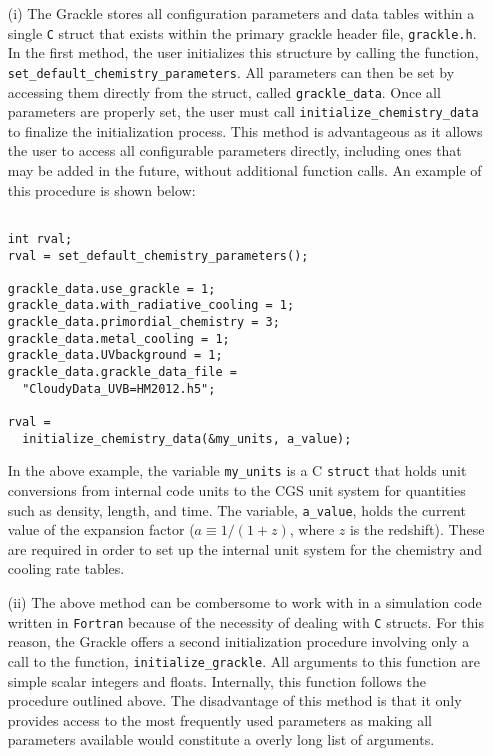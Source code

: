 \begin{enumerate}
\item[(i)] The Grackle stores all configuration parameters and data
  tables within a single \texttt{C} struct that exists within the
  primary grackle header file, \texttt{grackle.h}.  In the first
  method, the user initializes this structure by calling the function,
  \texttt{set\_default\_chemistry\_parameters}.  All parameters can
  then be set by accessing them directly from the struct, called
  \texttt{grackle\_data}.  Once all parameters are properly set, the
  user must call \texttt{initialize\_chemistry\_data} to finalize the
  initialization process.  This method is advantageous as it allows
  the user to access all configurable parameters directly, including
  ones that may be added in the future, without additional function
  calls.  An example of this procedure is shown below:

\vspace{0.5cm}
\begin{minipage}[b]{0.5\linewidth}
\begin{verbatim}

int rval;
rval = set_default_chemistry_parameters();

grackle_data.use_grackle = 1;
grackle_data.with_radiative_cooling = 1;
grackle_data.primordial_chemistry = 3;
grackle_data.metal_cooling = 1;
grackle_data.UVbackground = 1;
grackle_data.grackle_data_file = 
  "CloudyData_UVB=HM2012.h5";

rval = 
  initialize_chemistry_data(&my_units, a_value);

\end{verbatim}
\end{minipage}

In the above example, the variable \texttt{my\_units} is a C
\texttt{struct} that holds unit conversions from internal code units
to the CGS unit system for quantities such as density, length, and
time.  The variable, \texttt{a\_value}, holds the current value of the
expansion factor ($a \equiv 1/(1+z)$, where $z$ is the redshift).  These
are required in order to set up the internal unit system for the
chemistry and cooling rate tables.

\item[(ii)] The above method can be combersome to work with in a
  simulation code written in \texttt{Fortran} because of the necessity
  of dealing with \texttt{C} structs.  For this reason, the Grackle
  offers a second initialization procedure involving only a call to
  the function, \texttt{initialize\_grackle}.  All arguments to this
  function are simple scalar integers and floats.  Internally, this
  function follows the procedure outlined above.  The disadvantage of
  this method is that it only provides access to the most frequently
  used parameters as making all parameters available would constitute
  a overly long list of arguments.

\end{enumerate}

